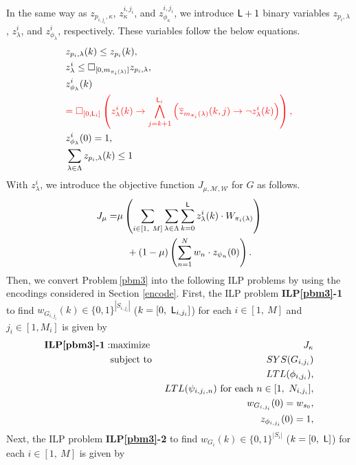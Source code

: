 \documentclass[journal,twoside,web]{IEEEtran}
\newcommand{\rpbm}[1]{Problem\,\ref{#1}}
\newcommand{\Len}{{\sf L}}
\newcommand{\M}{\mathcal{M}}
\newcommand{\W}{\mathcal{W}}
\newcommand{\G}[1]{\Box_{[#1]}}
\newcommand{\red}[1]{\textcolor{red}{#1}}
\begin{document}
In the same way as $z_{p_{i,{j_i}},\kappa}$, ${z}^{i,j_i}_\kappa$, and $z^{i,j_i}_{\phi_\kappa}$, we introduce  $\Len + 1$ binary variables $z_{p_{i},\lambda}$, $z_\lambda^i$, and $z^{i}_{\phi_\lambda} $, respectively.
These variables follow the below equations.
\begin{align}
&{z}_{p_{i},\lambda}(k) \leq z_{p_{i}}(k), \label{hier2-1}\\
%
&{z}^{i}_\lambda
\leq\G{0,m_{\pi_{i}(\lambda)}} z_{p_{i},\lambda},\label{hier2-2}\\
%
&z^{i}_{\phi_\lambda} (k)
\notag \\
&
\red{
=\G{0,\Len_i}
\left(
{z}_\lambda^{i} (k)\to
\bigwedge_{j=k+1}^{\Len_i}
\left(
\overline{z}_{m_{\pi_{i}}(\lambda)}
(k,j)\to \lnot {z}^{i}_\lambda (k)
\right)
\right),}\label{hier2-3}\\
%
&z^{i}_{\phi_\lambda} (0)=1,\\
%
&\sum_{\lambda\in\Lambda}{z}_{p_{i},\lambda}(k) \leq 1\label{hier2-4}
\end{align}
%
With ${z}^{i}_\lambda$, we introduce the objective function  $J_{\mu,\M,\W}$ for $G$ as follows.
\begin{align}
J_{\mu}=&
\mu\left(\sum_{i\in[1,~M]} \sum_{\lambda\in\Lambda} \sum_{k=0}^{\Len} {z}^i_\lambda
(k) \cdot W_{\pi_i(\lambda)}\right)
\notag\\
&~~~+
(1-\mu)\left(\sum_{n=1}^{N} w_{n}\cdot z_{\psi_{n}}(0)\right).\label{obj}\notag
\end{align}
%
Then, we convert \rpbm{pbm3} into the following ILP problems by using the encodings considered in Section \ref{encode}. 
First, the ILP problem {\bf ILP\ref{pbm3}-1} to find $w_{G_{i,j_i}}(k)\in\{0,1\}^{|S_{i,j_i}|}$ ($k=[0,~\Len_{i,j_i}]$) for each $i\in[1,~M]$ and $j_i \in [1,M_i]$ is given by
%
\begin{eqnarray}
\mbox{\bf ILP\ref{pbm3}-1}: &\mbox{maximize }&J_\kappa \notag \\
&\mbox{subject to }&SYS(G_{i,j_i}) \notag \\
&& LTL(\phi_{i,j_i}),\notag \\
&& LTL(\psi_{i,j_i,n}) \  {\rm{for\ each\ }}  n \in [1,\ N_{i,j_i}], \notag\\
&& w_{G_{i,j_i}}(0)=w_{s_0}, \notag \\
&&z_{\phi_{i,j_i}} (0) = 1, \notag
\end{eqnarray}
Next, the ILP problem {\bf ILP\ref{pbm3}-2} to find $w_{G_i}(k)\in\{0,1\}^{|S_i|}$ ($k=[0,~\Len]$) for each $i\in[1,~M]$ is given by
\end{document}
